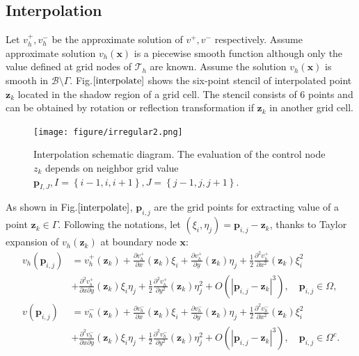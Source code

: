 \documentclass{article}
\begin{document}
\subsection{Interpolation} \label{one_GPU:interpolation}
Let $v_{h}^{+}, v_{h}^{-}$ be the approximate solution of $v^{+}, v^{-}$ respectively. Assume approximate solution $v_{h}(\mathbf{x})$ is a piecewise smooth function although only the value defined at grid nodes of $\mathcal{T}_{h}$ are known. Assume the solution $v_{h}(\mathbf{x})$ is smooth in $\mathcal{B}\setminus \Gamma$. Fig.$\ref{interpolate}$ shows the six-point stencil of interpolated point $\mathbf{z}_{k}$ located in the shadow region of a grid cell. The stencil consists of 6 points and can be obtained by rotation or reflection transformation if $\mathbf{z}_{k}$ in another grid cell.
\begin{figure}[hbpt!]
    \centering
    \texttt{[image: figure/irregular2.png]}
    \caption{Interpolation schematic diagram. The evaluation of the control node $z_{k}$ depends on neighbor grid value $\mathbf{p}_{I,J}, I = \left\{i-1, i, i+1\right\}, J = \left\{j-1, j, j+1\right\}$.}
    \label{interpolate}
\end{figure}

As shown in Fig.$\ref{interpolate}$, $\mathbf{p}_{i,j}$ are the grid points for extracting value of a point $\mathbf{z}_{k} \in \Gamma$. Following the notations, let $(\xi_{i}, \eta_{j}) = \mathbf{p}_{i,j} - \mathbf{z}_{k}$, thanks to Taylor expansion of $v_{h}(\mathbf{z}_{k})$ at boundary node $\mathbf{x}$:
\begin{equation}
    \begin{aligned}
    v_{h}(\mathbf{p}_{i,j}) & = v_{h}^{+}(\mathbf{z}_{k})+ \frac{\partial v_{h}^{+}}{\partial x}(\mathbf{z}_{k})\xi_{i} + \frac{\partial v_{h}^{+}}{\partial y}(\mathbf{z}_{k}) \eta_{j} + \frac{1}{2}\frac{\partial^{2} v_{h}^{+}}{\partial x^{2}}(\mathbf{z}_{k})\xi_{i}^{2}\\
    & + \frac{\partial^{2} v_{h}^{+}}{\partial x \partial y}(\mathbf{z}_{k})\xi_{i}\eta_{j} + \frac{1}{2}\frac{\partial^{2} v_{h}^{+}}{\partial y^{2}}(\mathbf{z}_{k})\eta_{j}^{2} + O(|\mathbf{p}_{i,j} - \mathbf{z}_{k}|^{3}), \quad \mathbf{p}_{i,j} \in \Omega, \\
    v(\mathbf{p}_{i,j}) & = v_{h}^{-}(\mathbf{z}_{k})+ \frac{\partial v_{h}^{-}}{\partial x}(\mathbf{z}_{k})\xi_{i} + \frac{\partial v_{h}^{-}}{\partial y}(\mathbf{z}_{k}) \eta_{j} + \frac{1}{2}\frac{\partial^{2} v_{h}^{-}}{\partial x^{2}}(\mathbf{z}_{k})\xi_{i}^{2}\\
    & + \frac{\partial^{2} v_{h}^{-}}{\partial x \partial y}(\mathbf{z}_{k})\xi_{i}\eta_{j} + \frac{1}{2}\frac{\partial^{2} v_{h}^{-}}{\partial y^{2}}(\mathbf{z}_{k})\eta_{j}^{2} + O(|\mathbf{p}_{i,j} - \mathbf{z}_{k}|^{3}), \quad \mathbf{p}_{i,j} \in \Omega^{c}. \label{interpolate2}
    \end{aligned}
\end{equation}
\end{document}
